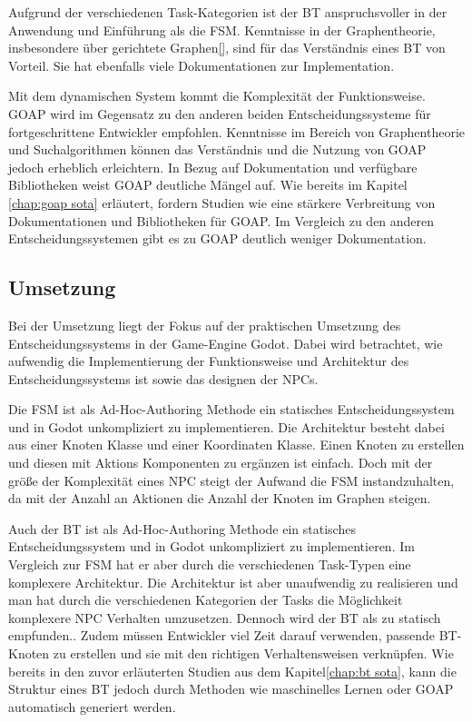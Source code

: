 Aufgrund der verschiedenen Task-Kategorien ist der BT anspruchsvoller in der Anwendung und Einf\"{u}hrung als die FSM. Kenntnisse in der Graphentheorie, insbesondere \"{u}ber gerichtete Graphen\ref{}, sind f\"{u}r das Verst\"{a}ndnis eines BT von Vorteil. Sie hat ebenfalls viele Dokumentationen zur Implementation.

Mit dem dynamischen System kommt die Komplexit\"{a}t der Funktionsweise. GOAP wird im Gegensatz zu den anderen beiden Entscheidungssysteme f\"{u}r fortgeschrittene Entwickler empfohlen. Kenntnisse im Bereich von Graphentheorie und Suchalgorithmen k\"{o}nnen das Verst\"{a}ndnis und die Nutzung von GOAP jedoch erheblich erleichtern. In Bezug auf Dokumentation und verf\"{u}gbare Bibliotheken weist GOAP deutliche M\"{a}ngel auf. Wie bereits im Kapitel \ref{chap:goap sota} erl\"{a}utert, fordern Studien wie \autocite{sielicki2018adaptation} eine st\"{a}rkere Verbreitung von Dokumentationen und Bibliotheken f\"{u}r GOAP. Im Vergleich zu den anderen Entscheidungssystemen gibt es zu GOAP deutlich weniger Dokumentation.


\subsection{Umsetzung}
\label{chap:umsetzung}

Bei der Umsetzung liegt der Fokus auf der praktischen Umsetzung des Entscheidungssystems in der Game-Engine Godot. Dabei wird betrachtet, wie aufwendig die Implementierung der Funktionsweise und Architektur des Entscheidungssystems ist sowie das designen der NPCs.

Die FSM ist als Ad-Hoc-Authoring Methode ein statisches Entscheidungssystem und in Godot unkompliziert zu implementieren. Die Architektur besteht dabei aus einer Knoten Klasse und einer Koordinaten Klasse. Einen Knoten zu erstellen und diesen mit Aktions Komponenten zu erg\"{a}nzen ist einfach. Doch mit der gr\"{o}\ss{}e der Komplexit\"{a}t eines NPC steigt der Aufwand die FSM instandzuhalten, da mit der Anzahl an Aktionen die Anzahl der Knoten im Graphen steigen.

Auch der BT ist als Ad-Hoc-Authoring Methode ein statisches Entscheidungssystem und in Godot unkompliziert zu implementieren. Im Vergleich zur FSM hat er aber durch die verschiedenen Task-Typen eine komplexere Architektur. Die Architektur ist aber unaufwendig zu realisieren und man hat durch die verschiedenen Kategorien der Tasks die M\"{o}glichkeit komplexere NPC Verhalten umzusetzen. Dennoch wird der BT als zu statisch empfunden.\autocite{aiag}. Zudem m\"{u}ssen Entwickler viel Zeit darauf verwenden, passende BT-Knoten zu erstellen und sie mit den richtigen Verhaltensweisen verkn\"{u}pfen.\autocite{Schwab2021} Wie bereits in den zuvor erl\"{a}uterten Studien aus dem Kapitel\ref{chap:bt sota}, kann die Struktur eines BT jedoch durch Methoden wie maschinelles Lernen oder GOAP automatisch generiert werden.

